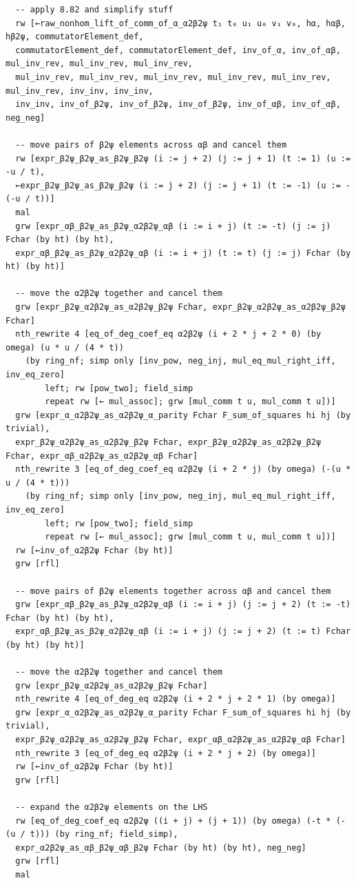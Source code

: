 \begin{Verbatim}
  -- apply 8.82 and simplify stuff
  rw [←raw_nonhom_lift_of_comm_of_α_α2β2ψ t₁ t₀ u₁ u₀ v₁ v₀, hα, hαβ, hβ2ψ, commutatorElement_def,
  commutatorElement_def, commutatorElement_def, inv_of_α, inv_of_αβ, mul_inv_rev, mul_inv_rev, mul_inv_rev,
  mul_inv_rev, mul_inv_rev, mul_inv_rev, mul_inv_rev, mul_inv_rev, mul_inv_rev, inv_inv, inv_inv,
  inv_inv, inv_of_β2ψ, inv_of_β2ψ, inv_of_β2ψ, inv_of_αβ, inv_of_αβ, neg_neg]

  -- move pairs of β2ψ elements across αβ and cancel them
  rw [expr_β2ψ_β2ψ_as_β2ψ_β2ψ (i := j + 2) (j := j + 1) (t := 1) (u := -u / t),
  ←expr_β2ψ_β2ψ_as_β2ψ_β2ψ (i := j + 2) (j := j + 1) (t := -1) (u := -(-u / t))]
  mal
  grw [expr_αβ_β2ψ_as_β2ψ_α2β2ψ_αβ (i := i + j) (t := -t) (j := j) Fchar (by ht) (by ht),
  expr_αβ_β2ψ_as_β2ψ_α2β2ψ_αβ (i := i + j) (t := t) (j := j) Fchar (by ht) (by ht)]

  -- move the α2β2ψ together and cancel them
  grw [expr_β2ψ_α2β2ψ_as_α2β2ψ_β2ψ Fchar, expr_β2ψ_α2β2ψ_as_α2β2ψ_β2ψ Fchar]
  nth_rewrite 4 [eq_of_deg_coef_eq α2β2ψ (i + 2 * j + 2 * 0) (by omega) (u * u / (4 * t))
    (by ring_nf; simp only [inv_pow, neg_inj, mul_eq_mul_right_iff, inv_eq_zero]
        left; rw [pow_two]; field_simp
        repeat rw [← mul_assoc]; grw [mul_comm t u, mul_comm t u])]
  grw [expr_α_α2β2ψ_as_α2β2ψ_α_parity Fchar F_sum_of_squares hi hj (by trivial),
  expr_β2ψ_α2β2ψ_as_α2β2ψ_β2ψ Fchar, expr_β2ψ_α2β2ψ_as_α2β2ψ_β2ψ Fchar, expr_αβ_α2β2ψ_as_α2β2ψ_αβ Fchar]
  nth_rewrite 3 [eq_of_deg_coef_eq α2β2ψ (i + 2 * j) (by omega) (-(u * u / (4 * t)))
    (by ring_nf; simp only [inv_pow, neg_inj, mul_eq_mul_right_iff, inv_eq_zero]
        left; rw [pow_two]; field_simp
        repeat rw [← mul_assoc]; grw [mul_comm t u, mul_comm t u])]
  rw [←inv_of_α2β2ψ Fchar (by ht)]
  grw [rfl]

  -- move pairs of β2ψ elements together across αβ and cancel them
  grw [expr_αβ_β2ψ_as_β2ψ_α2β2ψ_αβ (i := i + j) (j := j + 2) (t := -t) Fchar (by ht) (by ht),
  expr_αβ_β2ψ_as_β2ψ_α2β2ψ_αβ (i := i + j) (j := j + 2) (t := t) Fchar (by ht) (by ht)]

  -- move the α2β2ψ together and cancel them
  grw [expr_β2ψ_α2β2ψ_as_α2β2ψ_β2ψ Fchar]
  nth_rewrite 4 [eq_of_deg_eq α2β2ψ (i + 2 * j + 2 * 1) (by omega)]
  grw [expr_α_α2β2ψ_as_α2β2ψ_α_parity Fchar F_sum_of_squares hi hj (by trivial),
  expr_β2ψ_α2β2ψ_as_α2β2ψ_β2ψ Fchar, expr_αβ_α2β2ψ_as_α2β2ψ_αβ Fchar]
  nth_rewrite 3 [eq_of_deg_eq α2β2ψ (i + 2 * j + 2) (by omega)]
  rw [←inv_of_α2β2ψ Fchar (by ht)]
  grw [rfl]

  -- expand the α2β2ψ elements on the LHS
  rw [eq_of_deg_coef_eq α2β2ψ ((i + j) + (j + 1)) (by omega) (-t * (-(u / t))) (by ring_nf; field_simp),
  expr_α2β2ψ_as_αβ_β2ψ_αβ_β2ψ Fchar (by ht) (by ht), neg_neg]
  grw [rfl]
  mal


\end{Verbatim}
